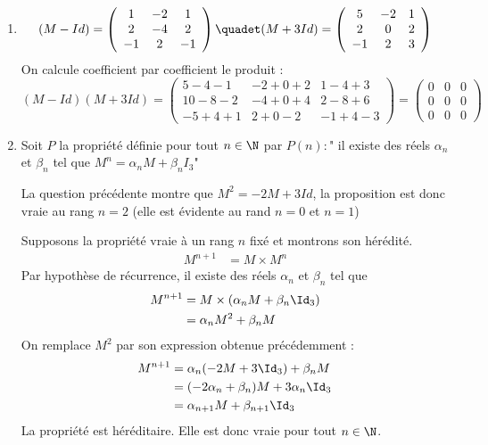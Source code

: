 \begin{correction}
\begin{enumerate}
\item $$(M - Id) =\left( 
\begin{array}{ccc}
1 & -2 & 1\\
2 & -4 & 2\\
-1 & 2 & -1 
\end{array}
\right) \quadet 
(M +3Id) = \left( 
\begin{array}{ccc}
5 & -2 & 1\\
2 & 0 & 2\\
-1 & 2 & 3 
\end{array}
\right) 
$$ 
On calcule coefficient par coefficient le produit : 
$$(M - Id) (M +3Id)  =\left( 
\begin{array}{ccc}
5-4-1 &  -2+0+2 & 1-4+3\\
10 -8-2 & -4+0+4 & 2-8+6\\
-5+4+1& 2+0-2 & -1+4-3 
\end{array}
\right) =\left( 
\begin{array}{ccc}
0&0&0\\
0&0&0\\
0&0&0
\end{array}
\right)  $$

\item Soit $P$ la propriété définie pour tout $n\in \N$ par 
$P(n) : $" il existe des réels $\alpha_n $ et $\beta_n$ tel que $M^n =\alpha_n M +\beta_n I_3$"  

 La question précédente montre que $M^2=-2M +3Id$, la proposition est donc  vraie au rang $n=2$ (elle est évidente au rand $n=0$ et $n=1$) 
 
Supposons la propriété vraie à un rang $n$ fixé et  montrons son hérédité. 
\begin{align*}
M^{n+1} &= M \times M^n
\end{align*}
Par hypothèse de récurrence, il existe des réels $\alpha_n $ et $\beta_n$ tel que 
\begin{align*}
M^{n+1} &= M \times (\alpha_n M +\beta_n \Id_3)\\
				&= \alpha_n M^2 +\beta_n M
\end{align*}
 On remplace $M^2$ par son expression obtenue précédemment : 
 \begin{align*}
M^{n+1} &= \alpha_n (-2M +3\Id_3) +\beta_n M\\
				&= (-2\alpha_n +\beta_n) M +3 \alpha_n \Id_3\\
				&=\alpha_{n+1} M +\beta_{n+1} \Id_3
\end{align*}
La propriété est héréditaire. Elle est donc vraie pour tout $n\in \N$. 



\end{enumerate}
\end{correction}
